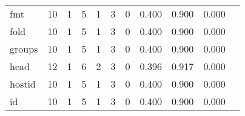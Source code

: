 \begin{longtable}{lp{1.2cm}p{1.2cm}p{1.2cm}p{1.2cm}p{1.2cm}p{1.2cm}p{1.2cm}p{1.2cm}p{1.2cm}p{1.2cm}}
fmt       &                                    10 &                                                  1 &                                                  5 &                                                  1 &                                                  3 &                                                  0 &                                         0.400 &                                              0.900 &                                              0.000 \\
fold      &                                    10 &                                                  1 &                                                  5 &                                                  1 &                                                  3 &                                                  0 &                                         0.400 &                                              0.900 &                                              0.000 \\
groups    &                                    10 &                                                  1 &                                                  5 &                                                  1 &                                                  3 &                                                  0 &                                         0.400 &                                              0.900 &                                              0.000 \\
head      &                                    12 &                                                  1 &                                                  6 &                                                  2 &                                                  3 &                                                  0 &                                         0.396 &                                              0.917 &                                              0.000 \\
hostid    &                                    10 &                                                  1 &                                                  5 &                                                  1 &                                                  3 &                                                  0 &                                         0.400 &                                              0.900 &                                              0.000 \\
id        &                                    10 &                                                  1 &                                                  5 &                                                  1 &                                                  3 &                                                  0 &                                         0.400 &                                              0.900 &                                              0.000 \\

\end{longtable}
